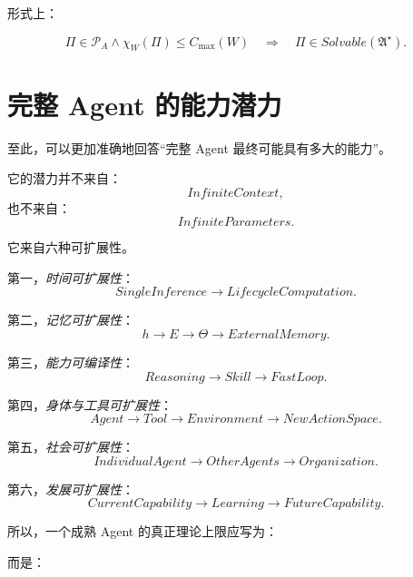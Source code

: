 形式上：

\begin{equation}
\boxed{
\Pi\in\mathscr P_A
\land
\chi_W(\Pi)\leq C_{\max}(W)
\quad
\Longrightarrow
\quad
\Pi\in Solvable(\mathfrak A^\star).
}
\end{equation}

\section{完整 Agent 的能力潜力}

至此，可以更加准确地回答“完整 Agent 最终可能具有多大的能力”。

它的潜力并不来自：
\begin{equation}
InfiniteContext,
\end{equation}
也不来自：
\begin{equation}
InfiniteParameters.
\end{equation}

它来自六种可扩展性。

第一，\emph{时间可扩展性}：
\begin{equation}
SingleInference
\rightarrow
LifecycleComputation.
\end{equation}

第二，\emph{记忆可扩展性}：
\begin{equation}
h
\rightarrow
E
\rightarrow
\Theta
\rightarrow
ExternalMemory.
\end{equation}

第三，\emph{能力可编译性}：
\begin{equation}
Reasoning
\rightarrow
Skill
\rightarrow
FastLoop.
\end{equation}

第四，\emph{身体与工具可扩展性}：
\begin{equation}
Agent
\rightarrow
Tool
\rightarrow
Environment
\rightarrow
NewActionSpace.
\end{equation}

第五，\emph{社会可扩展性}：
\begin{equation}
IndividualAgent
\rightarrow
OtherAgents
\rightarrow
Organization.
\end{equation}

第六，\emph{发展可扩展性}：
\begin{equation}
CurrentCapability
\rightarrow
Learning
\rightarrow
FutureCapability.
\end{equation}

所以，一个成熟 Agent 的真正理论上限应写为：
\begin{statementbox}
\centering
{}
\end{statementbox}
而是：
\begin{statementbox}
\centering
{}
\end{statementbox}

